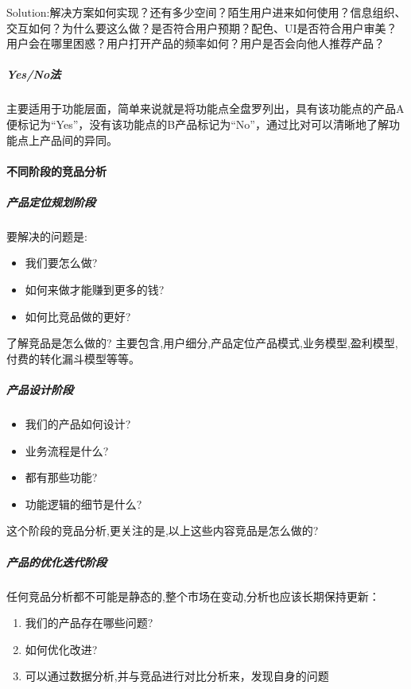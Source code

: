 \documentclass[letterpaper,11pt,english]{sphinxmanual}
\begin{document}
Solution:解决方案如何实现？还有多少空间？陌生用户进来如何使用？信息组织、交互如何？为什么要这么做？是否符合用户预期？配色、UI是否符合用户审美？用户会在哪里困惑？用户打开产品的频率如何？用户是否会向他人推荐产品？


\subparagraph{Yes/No法}
\label{\detokenize{chapter_knowledge/goods_analysis:yes-no}}
主要适用于功能层面，简单来说就是将功能点全盘罗列出，具有该功能点的产品A便标记为“Yes”，没有该功能点的B产品标记为“No”，通过比对可以清晰地了解功能点上产品间的异同。


\paragraph{不同阶段的竞品分析}
\label{\detokenize{chapter_knowledge/goods_analysis:id25}}

\subparagraph{产品定位规划阶段}
\label{\detokenize{chapter_knowledge/goods_analysis:id26}}
要解决的问题是:
\begin{itemize}
\item {} 
我们要怎么做?

\item {} 
如何来做才能赚到更多的钱?

\item {} 
如何比竞品做的更好?

\end{itemize}

了解竞品是怎么做的?
主要包含,用户细分,产品定位产品模式,业务模型,盈利模型,付费的转化漏斗模型等等。


\subparagraph{产品设计阶段}
\label{\detokenize{chapter_knowledge/goods_analysis:id27}}\begin{itemize}
\item {} 
我们的产品如何设计?

\item {} 
业务流程是什么?

\item {} 
都有那些功能?

\item {} 
功能逻辑的细节是什么?

\end{itemize}

这个阶段的竞品分析,更关注的是,以上这些内容竞品是怎么做的?


\subparagraph{产品的优化迭代阶段}
\label{\detokenize{chapter_knowledge/goods_analysis:id28}}
任何竞品分析都不可能是静态的,整个市场在变动,分析也应该长期保持更新：
\begin{enumerate}
%
\item {} 
我们的产品存在哪些问题?

\item {} 
如何优化改进?

\item {} 
可以通过数据分析,并与竞品进行对比分析来，发现自身的问题

\end{enumerate}
\end{document}
